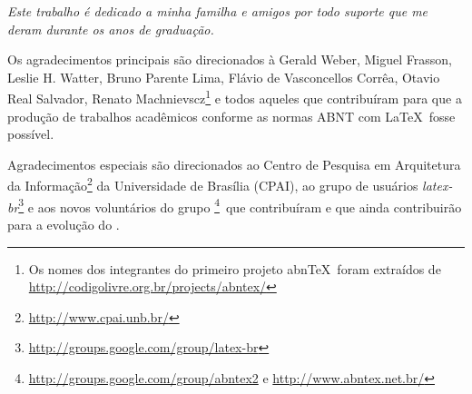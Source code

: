 \documentclass[
	12pt,				%
	openright,			%
	twoside,			%
	a4paper,			%
	english,			%
	french,				%
	spanish,			%
	brazil				%
	]{abntex2}
\begin{document}

%      
  

\begin{dedicatoria}
   \vspace*{\fill}
   \centering
   \noindent
   \textit{ Este trabalho é dedicado a minha familha e amigos por todo suporte que me deram durante os anos de graduação.} \vspace*{\fill}
\end{dedicatoria}

\begin{agradecimentos}
Os agradecimentos principais são direcionados à Gerald Weber, Miguel Frasson,
Leslie H. Watter, Bruno Parente Lima, Flávio de Vasconcellos Corrêa, Otavio Real
Salvador, Renato Machnievscz\footnote{Os nomes dos integrantes do primeiro
projeto abn\TeX\ foram extraídos de
\url{http://codigolivre.org.br/projects/abntex/}} e todos aqueles que
contribuíram para que a produção de trabalhos acadêmicos conforme
as normas ABNT com \LaTeX\ fosse possível.

Agradecimentos especiais são direcionados ao Centro de Pesquisa em Arquitetura
da Informação\footnote{\url{http://www.cpai.unb.br/}} da Universidade de
Brasília (CPAI), ao grupo de usuários
\emph{latex-br}\footnote{\url{http://groups.google.com/group/latex-br}} e aos
novos voluntários do grupo
\emph{\abnTeX}\footnote{\url{http://groups.google.com/group/abntex2} e
\url{http://www.abntex.net.br/}}~que contribuíram e que ainda
contribuirão para a evolução do \abnTeX.

\end{agradecimentos}
\end{document}
